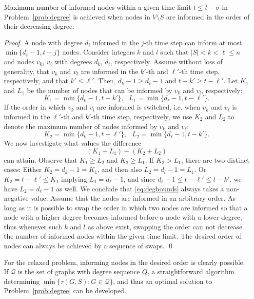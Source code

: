\begin{lemma}
\label{lemma:degorder}
Maximum number of informed nodes within a given time limit $t\leq \bar{t} - \sigma$ in Problem~\ref{prob:degree} is achieved when nodes in $V\setminus S$ are informed 
in the order of their decreasing degree.
\end{lemma}
\begin{proof}

A node with degree $d_i$ informed in the $j$-th time step can inform at most $\min\{d_i-1,t-j\}$ nodes.
Consider integers  $k$ and $l$ such that $|S|< k < \ell\leq n$ and nodes $v_k$, $v_\ell$ with degrees $d_k$, $d_\ell$, respectively.
Assume without loss of generality, that $v_k$ and $v_l$ are informed in the $k'$-th and $\ell'$-th time step, respectively, and that $k'\leq\ell'$.
Then, $d_k-1\geq d_\ell-1$ and $t-k' \geq t-\ell'$.
Let $K_1$ and $L_1$ be the number of nodes that can be informed by $v_k$ and $v_l$, respectively:
$$
K_1=\min\{d_k-1,t-k'\}, ~~~ L_1=\min\{d_\ell-1,t-\ell'\}.
$$
If the order in which $v_k$ and $v_l$ are informed is switched, i.e. when $v_k$ and $v_\ell$ is informed in the $\ell'$-th and $k'$-th time step, respectively, 
we use $K_2$ and $L_2$ to denote the maximum number of nodes informed by $v_k$ and $v_\ell$:
$$
K_2=\min\{d_k-1,t-\ell'\}, ~~~ L_2=\min\{d_\ell-1,t-k'\}.
$$
We now investigate what values the difference 
\begin{equation}
\label{eq:degbounds}
(K_1+L_1)-(K_2+L_2)
\end{equation}
can attain.
Observe that $K_1\geq L_2$ and $K_2\geq L_1$. 
If $K_2>L_1$, there are two distinct cases:
Either $K_2=d_k-1=K_1$, and then also $L_2=d_l-1=L_1$.
	Or $K_2=t-\ell'\leq K_1$ implying $L_1 =d_\ell-1$, and since $d_\ell-1\leq t-\ell'\leq t-k'$, we have $L_2=d_\ell-1$ as well.
We conclude that \eqref{eq:degbounds} always takes a non-negative value.
Assume that the nodes are informed in an arbitrary order.
As long as it is possible to swap the order in which two nodes are informed so that a node with a higher degree becomes informed before a node with a lower degree,
thus whenever such $k$ and $l$ as above exist, swapping the order can not decrease the number of informed nodes within the given time limit.
The desired order of nodes can always be achieved by a sequence of swaps.
\qed
\end{proof}
For the relaxed problem, informing nodes in the desired order is clearly possible.
If $\mathcal{Q}$ is the set of graphs with degree sequence $Q$, a straightforward algorithm determining
$\min\{\tau(G,S): G\in \mathcal{Q}\}$,
and thus an optimal solution to Problem~\ref{prob:degree} can be developed.

